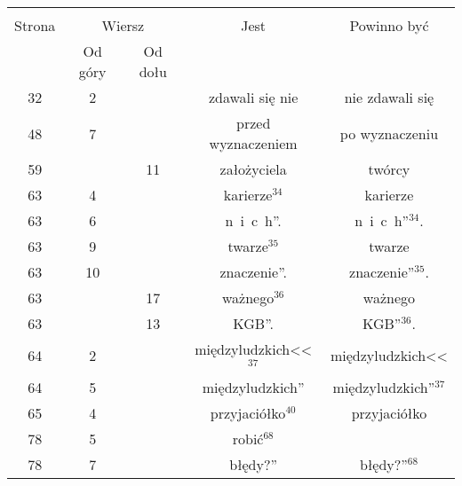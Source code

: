 \documentclass[a4paper,11pt]{article}
\begin{document}
\begin{center}

  \begin{tabular}{|c|c|c|c|c|}
    \hline
    & \multicolumn{2}{c|}{} & & \\
    Strona & \multicolumn{2}{c|}{Wiersz} & Jest
                              & Powinno być \\ \cline{2-3}
    & Od góry & Od dołu & & \\
    \hline
    32 &  2 & & zdawali się nie & nie zdawali się \\
    48 &  7 & & przed wyznaczeniem & po wyznaczeniu \\
    59 & & 11 & założyciela & twórcy \\
    63 &  4 & & karierze$^{ 34 }$ & karierze \\
    63 &  6 & & n~i~c~h”. & n~i~c~h”$^{ 34 }$. \\
    63 &  9 & & twarze$^{ 35 }$ & twarze \\
    63 & 10 & & znaczenie”. & znaczenie”$^{ 35 }$. \\
    63 & & 17 & ważnego$^{ 36 }$ & ważnego \\
    63 & & 13 & KGB”. & KGB”$^{ 36 }$. \\
    64 &  2 & & międzyludzkich<<$^{ 37 }$ & międzyludzkich<< \\
    64 &  5 & & międzyludzkich” & międzyludzkich”$^{ 37 }$ \\
    65 &  4 & & przyjaciółko$^{ 40 }$ & przyjaciółko \\
    78 &  5 & & robić$^{ 68 }$ & \\
    78 &  7 & & błędy?” & błędy?”$^{ 68 }$ \\
    \hline
  \end{tabular}

\end{center}


\vspace{\spaceTwo}












\end{document}
